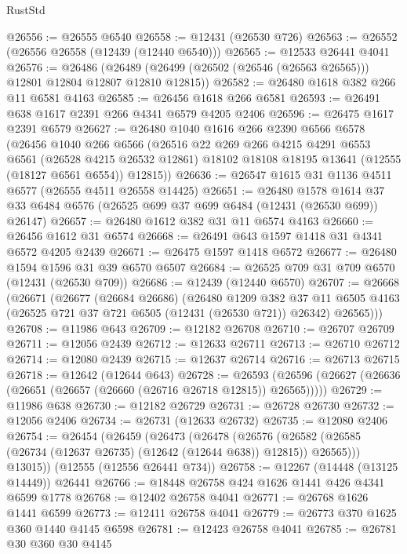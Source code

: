 \begin{lexlean}{RustStd}
\begin{coremodule}
@26556 := @26555 @6540
@26558 := @12431 (@26530 @726)
@26563 := @26552 (@26556 @26558 (@12439 (@12440 @6540)))
@26565 := @12533 @26441 @4041
@26576 := @26486
    (@26489 (@26499 (@26502 (@26546 (@26563 @26565))) @12801 @12804 @12807 @12810 @12815))
@26582 := @26480 @1618 @382 @266 @11 @6581 @4163
@26585 := @26456 @1618 @266 @6581
@26593 := @26491 @638 @1617 @2391 @266 @4341 @6579 @4205 @2406
@26596 := @26475 @1617 @2391 @6579
@26627 := @26480
    @1040
    @1616
    @266
    @2390
    @6566
    @6578
    (@26456
      @1040
      @266
      @6566
      (@26516
        @22
        @269
        @266
        @4215
        @4291
        @6553
        @6561
        (@26528 @4215 @26532 @12861)
        @18102
        @18108
        @18195
        @13641
        (@12555 (@18127 @6561 @6554))
        @12815))
@26636 := @26547 @1615 @31 @1136 @4511 @6577 (@26555 @4511 @26558 @14425)
@26651 := @26480
    @1578
    @1614
    @37
    @33
    @6484
    @6576
    (@26525 @699 @37 @699 @6484 (@12431 (@26530 @699)) @26147)
@26657 := @26480 @1612 @382 @31 @11 @6574 @4163
@26660 := @26456 @1612 @31 @6574
@26668 := @26491 @643 @1597 @1418 @31 @4341 @6572 @4205 @2439
@26671 := @26475 @1597 @1418 @6572
@26677 := @26480 @1594 @1596 @31 @39 @6570 @6507
@26684 := @26525 @709 @31 @709 @6570 (@12431 (@26530 @709))
@26686 := @12439 (@12440 @6570)
@26707 := @26668
    (@26671
      (@26677
        (@26684 @26686)
        (@26480
          @1209
          @382
          @37
          @11
          @6505
          @4163
          (@26525 @721 @37 @721 @6505 (@12431 (@26530 @721)) @26342)
          @26565)))
@26708 := @11986 @643
@26709 := @12182 @26708
@26710 := @26707 @26709
@26711 := @12056 @2439
@26712 := @12633 @26711
@26713 := @26710 @26712
@26714 := @12080 @2439
@26715 := @12637 @26714
@26716 := @26713 @26715
@26718 := @12642 (@12644 @643)
@26728 := @26593 (@26596 (@26627 (@26636 (@26651 (@26657 (@26660 (@26716 @26718 @12815)) @26565)))))
@26729 := @11986 @638
@26730 := @12182 @26729
@26731 := @26728 @26730
@26732 := @12056 @2406
@26734 := @26731 (@12633 @26732)
@26735 := @12080 @2406
@26754 := @26454
    (@26459
      (@26473
        (@26478
          (@26576 (@26582 (@26585 (@26734 (@12637 @26735) (@12642 (@12644 @638)) @12815)) @26565)))
        @13015))
    (@12555 (@12556 @26441 @734))
@26758 := @12267 (@14448 (@13125 @14449)) @26441
@26766 := @18448 @26758 @424 @1626 @1441 @426 @4341 @6599 @1778
@26768 := @12402 @26758 @4041
@26771 := @26768 @1626 @1441 @6599
@26773 := @12411 @26758 @4041
@26779 := @26773 @370 @1625 @360 @1440 @4145 @6598
@26781 := @12423 @26758 @4041
@26785 := @26781 @30 @360 @30 @4145

\end{coremodule}
\end{lexlean}
